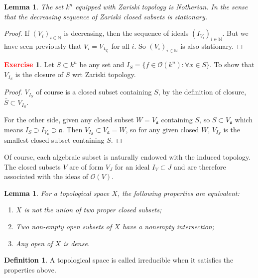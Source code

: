 \documentclass[12pt,a4paper,english]{article}
\theoremstyle{plain}
\newtheorem{lem}[thm]{Lemma}
\theoremstyle{definition}
\newtheorem{defi}{Definition}
\newtheorem{exercise}{\textbf{\textcolor{red}{Exercise}}}
\theoremstyle{remark}
\begin{document}
\begin{lem}
The set $k^{n}$ equipped with Zariski topology is Notherian. In the sense that the decreasing sequence of Zariski closed subsets is stationary.  
\end{lem}
\begin{proof}
If $(V_{i})_{i\in\mathbb{N}}$ is decreasing, then the sequence of ideals $(I_{V_{i}})_{i\in\mathbb{N}}$. But we have seen previously that $V_{i}=V_{I_{V_{i}}}$ for all $i$. So $(V_{i})_{i\in \mathbb{N}}$ is also stationary.
\end{proof}

\begin{exercise}
Let $S\subset k^{n}$ be any set and $I_{S}=\{f\in\mathcal{O}(k^{n}): \forall x\in S\}$. To show that $V_{I_{S}}$ is the closure of $S$ wrt Zariski topology.     
\end{exercise}
\begin{tcolorbox}
\begin{proof}
$V_{I_{S}}$ of course is a closed subset containing $S$, by the definition of closure,  $\bar{S}\subset V_{I_{S}}$.

For the other side, given any closed subset $W=V_{\mathfrak{a}}$ containing $S$, so $S\subset V_{\mathfrak{a}}$ which means $I_{S}\supset I_{V_{\mathfrak{a}}}\supset \mathfrak{a}$. Then $V_{I_{S}}\subset V_{\mathfrak{a}}=W$, so for any given closed $W$, $V_{I_{S}}$ is the smallest closed subset containing $S$.
\end{proof}
\end{tcolorbox}
Of course, each algebraic subset is naturally endowed with the induced topology. The closed subsets $V$ are of form $V_{J}$ for an ideal $I_{V}\subset J$ and are therefore associated with the ideas of $\mathcal{O}(V)$.
\begin{lem}
For a topological space $X$, the following properties are equivalent:

\begin{enumerate}
    \item $X$ is not the union of two proper closed subsets;
    \item Two non-empty open subsets of $X$ have a nonempty intersection;
    \item Any open of $X$ is dense.
\end{enumerate}
\end{lem}
\begin{defi}
A topological space is called irreducible when it satisfies the properties above.
\end{defi}
\end{document}
